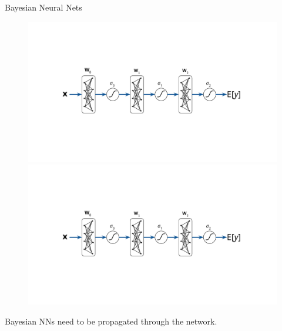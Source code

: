 \documentclass[lualatex, aspectratio=169]{beamer}
\begin{document}
\begin{frame}{Bayesian Neural Nets}

  \begin{figure}
    \includegraphics[page=1, trim={3cm 4.5cm 3cm 4.5cm}, clip, width=0.6\pagewidth]{assets/pictures.pdf}
    \includegraphics[page=3, trim={3cm 4.5cm 3cm 4.5cm}, clip, width=0.6\pagewidth]{assets/pictures.pdf}
  \end{figure}

  Bayesian NNs need  to be propagated through the network. 

\end{frame}
\end{document}
